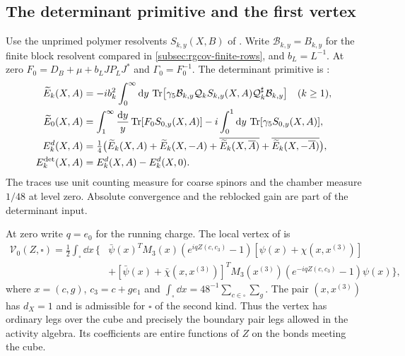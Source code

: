 \subsection{The determinant primitive and the first vertex}
Use the unprimed polymer resolvents $S_{k,y}(X,B)$ of
\cite[\S4.3]{FermionBlockManuscript}. Write
$\mathcal B_{k,y}=B_{k,y}$ for the finite block resolvent compared in
\cref{subsec:rgcov-finite-rows}, and $b_L=L^{-1}$.
At zero $F_0=D_B+\mu+b_LJP_LJ^*$ and $\Gamma_0=F_0^{-1}$.
The determinant primitive is \cite[(76)]{FermionBlockManuscript}:
\begin{align}
 \widetilde E_k(X,A)
    &=-ib_k^2\int_0^\infty\mathrm d y\,
       \operatorname{Tr}\bigl[\gamma_5\mathcal B_{k,y}\mathcal Q_k
           S_{k,y}(X,A)\mathcal Q_k^\sharp\mathcal B_{k,y}\bigr]
                   \quad(k\ge1),\label{eq:local-determinant-definition}\\
 \widetilde E_0(X,A)
    &=\int_1^\infty\frac{\mathrm d y}{y}
                     \operatorname{Tr}[F_0S_{0,y}(X,A)]
       -i\int_0^1\mathrm d y\,\operatorname{Tr}[\gamma_5S_{0,y}(X,A)],\notag\\
 E_k^d(X,A)&=\tfrac14\bigl(\widetilde E_k(X,A)
       +\widetilde E_k(X,-A)
       +\overline{\widetilde E_k(X,\overline A)}
       +\overline{\widetilde E_k(X,-\overline A)}\bigr),\notag\\
 E_k^{\mathrm{det}}(X,A)&=E_k^d(X,A)-E_k^d(X,0).\notag
\end{align}
The traces use unit counting measure for coarse spinors and the
chamber measure $1/48$ at level zero. Absolute convergence and the
reblocked gain are part of the determinant input.

At zero write $q=e_0$ for the running charge. The local vertex of
\cite[(47)]{NonlinearStep} is
\begin{equation}\label{eq:rg-step-first-vertex}
 \begin{split}
 \mathcal V_0(Z,\square)=\frac12\int_\square\dd x\,
   \Big\{&
    \bar\psi(x)^TM_3(x)(e^{iqZ(c,c_3)}-1)
                                  [\psi(x)+\chi(x,x^{(3)})]\\
    &+[\bar\psi(x)+\bar\chi(x,x^{(3)})]^T
               M_3(x^{(3)})(e^{-iqZ(c,c_3)}-1)\psi(x)\Big\},
 \end{split}
\end{equation}
where $x=(c,g)$, $c_3=c+ge_1$ and
$\int_\square\dd x=48^{-1}\sum_{c\in\square}\sum_g$.
The pair $(x,x^{(3)})$ has $d_X=1$ and is admissible
for $\square$ of the second kind. Thus the vertex
has ordinary legs over the cube and precisely the
boundary pair legs allowed in the activity algebra.
Its coefficients are entire functions of $Z$ on
the bonds meeting the cube.


